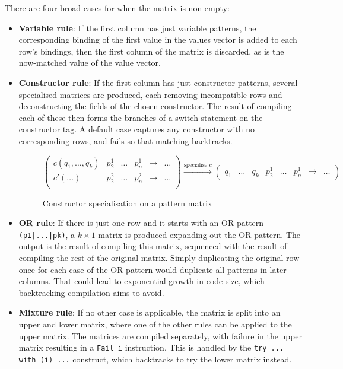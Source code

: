 There are four broad cases for when the matrix is non-empty:
\begin{itemize}
\item \textbf{Variable rule}: If the first column has just variable patterns, the corresponding binding of the first value in the values vector is added to each row's bindings, then the first column of the matrix is discarded, as is the now-matched value of the value vector.
\item \textbf{Constructor rule}: If the first column has just constructor patterns, several specialised matrices are produced, each removing incompatible rows and deconstructing the fields of the chosen constructor. The result of compiling each of these then forms the branches of a switch statement on the constructor tag. A default case captures any constructor with no corresponding rows, and fails so that matching backtracks. 
\begin{figure}[H]
\hfill
$
\begin{pmatrix}
c(q_1, \dots, q_k) & p^1_2 & \dots & p^1_n & \to & \dots \\
c'(\dots) & p^2_2 & \dots & p^2_n & \to & \dots \\
\end{pmatrix}
\xrightarrow{\text{specialise } c}
\begin{pmatrix}
 q_1 & \dots & q_k & p^1_2 & \dots & p^1_n  & \to & \dots 
\end{pmatrix}
$ \hfill
\caption{Constructor specialisation on a pattern matrix}
\end{figure}
\item \textbf{OR rule}: If there is just one row and it starts with an OR pattern \verb"(p1|...|pk)", a $k \times 1$ matrix is produced expanding out the OR pattern. %
The output is the result of compiling this matrix, sequenced with the result of compiling the rest of the original matrix. Simply duplicating the original row once for each case of the OR pattern would duplicate all patterns in later columns. That could lead to exponential growth in code size, which backtracking compilation aims to avoid.
\item \textbf{Mixture rule}: If no other case is applicable, the matrix is split into an upper and lower matrix, where one of the other rules can be applied to the upper matrix. The matrices are compiled separately, with failure in the upper matrix resulting in a \verb|Fail i| instruction. This is handled by the \verb|try ... with (i) ...| construct, which backtracks to try the lower matrix instead.

\end{itemize}

